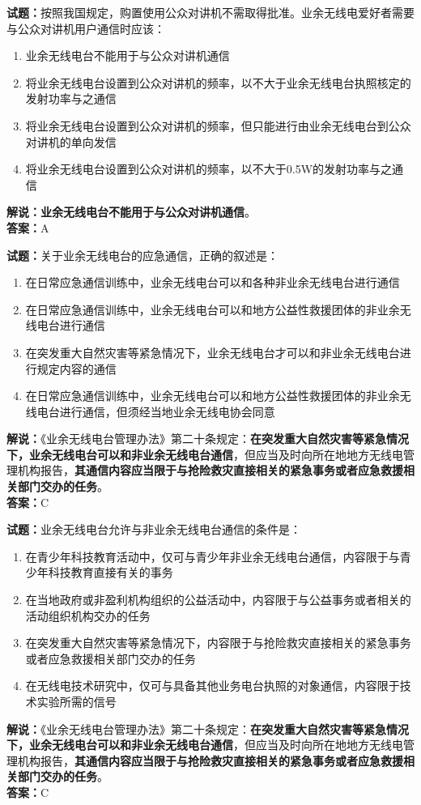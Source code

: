 \documentclass{ctexbook}
\begin{document}
\bigskip

\noindent\textbf{试题：}按照我国规定，购置使用公众对讲机不需取得批准。业余无线电爱好者需要与公众对讲机用户通信时应该：
\begin{enumerate}[leftmargin=3em]
  \item 业余无线电台不能用于与公众对讲机通信
  \item 将业余无线电台设置到公众对讲机的频率，以不大于业余无线电台执照核定的发射功率与之通信
  \item 将业余无线电台设置到公众对讲机的频率，但只能进行由业余无线电台到公众对讲机的单向发信
  \item 将业余无线电台设置到公众对讲机的频率，以不大于0.5W的发射功率与之通信
\end{enumerate}
\noindent\textbf{解说：}\textbf{业余无线电台不能用于与公众对讲机通信}。\\\noindent\textbf{答案：}A

\bigskip

\noindent\textbf{试题：}关于业余无线电台的应急通信，正确的叙述是：
\begin{enumerate}[leftmargin=3em]
  \item 在日常应急通信训练中，业余无线电台可以和各种非业余无线电台进行通信
  \item 在日常应急通信训练中，业余无线电台可以和地方公益性救援团体的非业余无线电台进行通信
  \item 在突发重大自然灾害等紧急情况下，业余无线电台才可以和非业余无线电台进行规定内容的通信
  \item 在日常应急通信训练中，业余无线电台可以和地方公益性救援团体的非业余无线电台进行通信，但须经当地业余无线电协会同意
\end{enumerate}
\noindent\textbf{解说：}《业余无线电台管理办法》第二十条规定：\textbf{在突发重大自然灾害等紧急情况下，业余无线电台可以和非业余无线电台通信}，但应当及时向所在地地方无线电管理机构报告，\textbf{其通信内容应当限于与抢险救灾直接相关的紧急事务或者应急救援相关部门交办的任务}。\\\noindent\textbf{答案：}C

\bigskip

\noindent\textbf{试题：}业余无线电台允许与非业余无线电台通信的条件是：
\begin{enumerate}[leftmargin=3em]
  \item 在青少年科技教育活动中，仅可与青少年非业余无线电台通信，内容限于与青少年科技教育直接有关的事务
  \item 在当地政府或非盈利机构组织的公益活动中，内容限于与公益事务或者相关的活动组织机构交办的任务
  \item 在突发重大自然灾害等紧急情况下，内容限于与抢险救灾直接相关的紧急事务或者应急救援相关部门交办的任务
  \item 在无线电技术研究中，仅可与具备其他业务电台执照的对象通信，内容限于技术实验所需的信号
\end{enumerate}
\noindent\textbf{解说：}《业余无线电台管理办法》第二十条规定：\textbf{在突发重大自然灾害等紧急情况下，业余无线电台可以和非业余无线电台通信}，但应当及时向所在地地方无线电管理机构报告，\textbf{其通信内容应当限于与抢险救灾直接相关的紧急事务或者应急救援相关部门交办的任务}。\\\noindent\textbf{答案：}C
\end{document}

